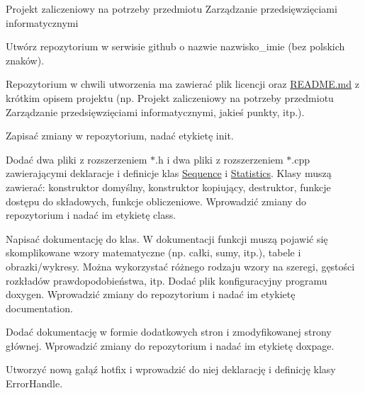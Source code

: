 Projekt zaliczeniowy na potrzeby przedmiotu Zarządzanie przedsięwzięciami informatycznymi
\begin{DoxyEnumerate}
\item Utwórz repozytorium w serwisie github o nazwie \textquotesingle{}nazwisko\+\_\+imie\textquotesingle{} (bez polskich znaków).
\item Repozytorium w chwili utworzenia ma zawierać plik licencji oraz \mbox{\hyperlink{_r_e_a_d_m_e_8md}{README.\+md}} z krótkim opisem projektu (np. Projekt zaliczeniowy na potrzeby przedmiotu Zarządzanie przedsięwzięciami informatycznymi, jakieś punkty, itp.).
\item Zapisać zmiany w repozytorium, nadać etykietę \textquotesingle{}init\textquotesingle{}.
\item Dodać dwa pliki z rozszerzeniem $\ast$.h i dwa pliki z rozszerzeniem $\ast$.cpp zawierającymi deklaracje i definicje klas \textquotesingle{}\mbox{\hyperlink{class_sequence}{Sequence}}\textquotesingle{} i \textquotesingle{}\mbox{\hyperlink{class_statistics}{Statistics}}\textquotesingle{}. Klasy muszą zawierać\+: konstruktor domyślny, konstruktor kopiujący, destruktor, funkcje dostępu do składowych, funkcje obliczeniowe. Wprowadzić zmiany do repozytorium i nadać im etykietę \textquotesingle{}class\textquotesingle{}.
\item Napisać dokumentację do klas. W dokumentacji funkcji muszą pojawić się skomplikowane wzory matematyczne (np. całki, sumy, itp.), tabele i obrazki/wykresy. Można wykorzystać różnego rodzaju wzory na szeregi, gęstości rozkładów prawdopodobieństwa, itp. Dodać plik konfiguracyjny programu doxygen. Wprowadzić zmiany do repozytorium i nadać im etykietę \textquotesingle{}documentation\textquotesingle{}.
\item Dodać dokumentację w formie dodatkowych stron i zmodyfikowanej strony głównej. Wprowadzić zmiany do repozytorium i nadać im etykietę \textquotesingle{}doxpage\textquotesingle{}.
\item Utworzyć nową gałąź \textquotesingle{}hotfix\textquotesingle{} i wprowadzić do niej deklarację i definicję klasy \textquotesingle{}Error\+Handle\textquotesingle{}. 
\end{DoxyEnumerate}